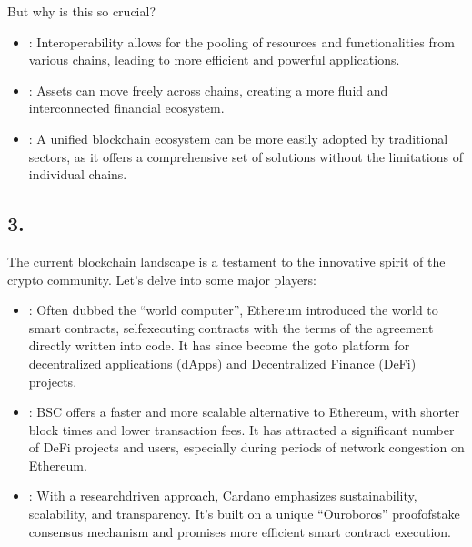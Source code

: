 \documentclass[letterpaper,10pt,english]{jupyterBook}
\begin{document}
\sphinxAtStartPar
But why is this so crucial?
\begin{itemize}
\item {} 
\sphinxAtStartPar
{}: Interoperability allows for the pooling of resources and functionalities from various chains, leading to more efficient and powerful applications.

\item {} 
\sphinxAtStartPar
{}: Assets can move freely across chains, creating a more fluid and interconnected financial ecosystem.

\item {} 
\sphinxAtStartPar
{}: A unified blockchain ecosystem can be more easily adopted by traditional sectors, as it offers a comprehensive set of solutions without the limitations of individual chains.

\end{itemize}


\subsection{3. }
\label{\detokenize{Interoperability/Cross-Chain Interoperability:the-landscape-of-blockchain-networks}}
\sphinxAtStartPar
The current blockchain landscape is a testament to the innovative spirit of the crypto community. Let’s delve into some major players:
\begin{itemize}
\item {} 
\sphinxAtStartPar
{}: Often dubbed the “world computer”, Ethereum introduced the world to smart contracts, self\sphinxhyphen{}executing contracts with the terms of the agreement directly written into code. It has since become the go\sphinxhyphen{}to platform for decentralized applications (dApps) and Decentralized Finance (DeFi) projects.

\item {} 
\sphinxAtStartPar
{}: BSC offers a faster and more scalable alternative to Ethereum, with shorter block times and lower transaction fees. It has attracted a significant number of DeFi projects and users, especially during periods of network congestion on Ethereum.

\item {} 
\sphinxAtStartPar
{}: With a research\sphinxhyphen{}driven approach, Cardano emphasizes sustainability, scalability, and transparency. It’s built on a unique “Ouroboros” proof\sphinxhyphen{}of\sphinxhyphen{}stake consensus mechanism and promises more efficient smart contract execution.

\end{itemize}
\end{document}
